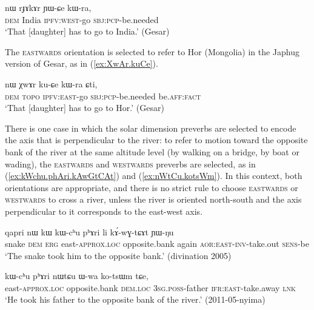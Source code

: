 \begin{exe}
\ex \label{ex:rJAkAr.YWCe}
\gll nɯ rɟɤkɤr ɲɯ-ɕe kɯ-ra, \\
\textsc{dem} India \textsc{ipfv}:\textsc{west}-go \textsc{sbj}:\textsc{pcp}-be.needed \\
\glt `That [daughter] has to go to India.' (Gesar)
\end{exe}

The \textsc{eastwards} orientation is selected to refer to Hor (Mongolia) in the Japhug version of Gesar, as in (\ref{ex:XwAr.kuCe}).

\begin{exe}
\ex \label{ex:XwAr.kuCe}
\gll  nɯ χwɤr ku-ɕe kɯ-ra ɕti, \\
\textsc{dem}  \textsc{topo} \textsc{ipfv}:\textsc{east}-go \textsc{sbj}:\textsc{pcp}-be.needed be.\textsc{aff}:\textsc{fact} \\
\glt `That [daughter] has to go to Hor.' (Gesar)
\end{exe} 


There is one case in which the solar dimension preverbs are selected to encode the axis that is perpendicular to the river: to refer to motion toward the opposite bank of the river at the same altitude level (by walking on a bridge, by boat or wading), the \textsc{eastwards} and \textsc{westwards} preverbs are selected, as in (\ref{ex:kWchu.phAri.kAwGtCAt}) and (\ref{ex:nWtCu.kotsWm}). In this context, both orientations are appropriate, and there is no strict rule to choose \textsc{eastwards} or \textsc{westwards} to cross a river, unless the river is oriented north-south and the axis perpendicular to it corresponds to the east-west axis.

\begin{exe}
\ex \label{ex:kWchu.phAri.kAwGtCAt}
\gll  qapri nɯ kɯ kɯ-cʰu pʰɤri li kɤ́-wɣ-tɕɤt ɲɯ-ŋu \\
snake \textsc{dem} \textsc{erg} east-\textsc{approx}.\textsc{loc} opposite.bank again \textsc{aor}:\textsc{east}-\textsc{inv}-take.out \textsc{sens}-be \\
\glt `The snake took him to the opposite bank.' (divination 2005)
\end{exe} 

\begin{exe}
\ex \label{ex:nWtCu.kotsWm}
\gll  kɯ-cʰu pʰɤri nɯtɕu ɯ-wa ko-tsɯm tɕe, \\
east-\textsc{approx}.\textsc{loc} opposite.bank \textsc{dem}.\textsc{loc} \textsc{3sg}.\textsc{poss}-father \textsc{ifr}:\textsc{east}-take.away \textsc{lnk} \\
\glt `He took his father to the opposite bank of the river.' (2011-05-nyima)
\end{exe}

